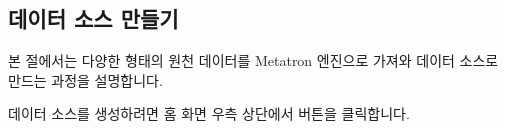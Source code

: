 \documentclass[letterpaper,10pt,english]{sphinxmanual}
\begin{document}
\subsection{데이터 소스 만들기}
\label{\detokenize{discovery/part02/create_a_data_source:id1}}\label{\detokenize{discovery/part02/create_a_data_source::doc}}
본 절에서는 다양한 형태의 원천 데이터를 Metatron 엔진으로 가져와 데이터 소스로 만드는 과정을 설명합니다.

데이터 소스를 생성하려면  홈 화면 우측 상단에서  버튼을 클릭합니다.
\begin{quote}

\begin{figure}[H]
\centering

\noindent{}
\end{figure}
\end{quote}
\end{document}
